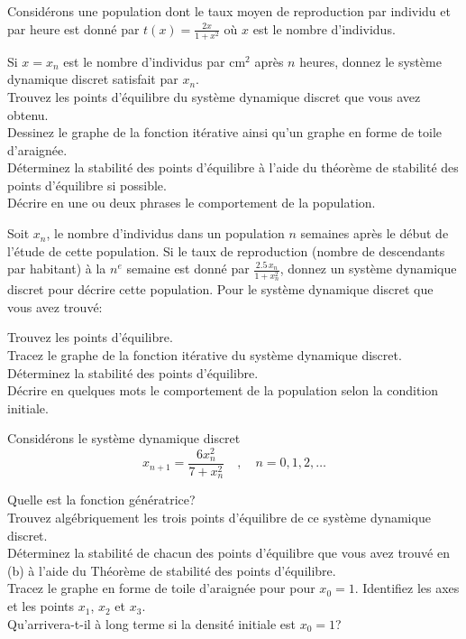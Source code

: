 \begin{question}[\life]
Considérons une population dont le taux moyen de reproduction par
individu et par heure est donné par
$\displaystyle t(x) = \frac{2 x}{1+x^2}$ où $x$ est le nombre
d'individus.

 Si $x=x_n$ est le nombre d'individus par cm$^2$ après $n$
heures, donnez le système dynamique discret satisfait par $x_n$.\\
 Trouvez les points d'équilibre du système dynamique discret que vous
avez obtenu.\\
 Dessinez le graphe de la fonction itérative ainsi qu'un graphe en
forme de toile d'araignée.\\
 Déterminez la stabilité des points d'équilibre à l'aide du théorème de
stabilité des points d'équilibre si possible.\\
 Décrire en une ou deux phrases le comportement de la population.
\label{6Q110}
\end{question}

\begin{question}[\life]
Soit $x_n$, le nombre d'individus dans un population $n$ semaines
après le début de l'étude de cette population.  Si le taux de
reproduction (nombre de descendants par habitant) à la $n^e$ semaine
est donné par $\displaystyle \frac{2.5\,x_n}{1+x_n^2}$, donnez un
système dynamique discret pour décrire cette population.  Pour le
système dynamique discret que vous avez trouvé:

 Trouvez les points d'équilibre.\\
 Tracez le graphe de la fonction itérative du système dynamique
discret.\\
 Déterminez la stabilité des points d'équilibre.\\
 Décrire en quelques mots le comportement de la population selon la
condition initiale.
\label{6Q111}
\end{question}

\begin{question}[\life]
Considérons le système dynamique discret
\[
  x_{n+1} =  \frac{6 x_n^2}{7 + x_n^2} \quad , \quad n=0, 1, 2, \ldots
\]

 Quelle est la fonction génératrice?\\
 Trouvez algébriquement les trois points d'équilibre de ce
système dynamique discret.\\
 Déterminez la stabilité de chacun des points d'équilibre que
vous avez trouvé en (b) à l'aide du Théorème de stabilité des points
d'équilibre.\\
 Tracez le graphe en forme de toile d'araignée pour pour
$x_0 = 1$.  Identifiez les axes et les points $x_1$, $x_2$ et $x_3$.\\
 Qu'arrivera-t-il à long terme si la densité initiale est
$x_0=1$?
\label{6Q112}
\end{question}

